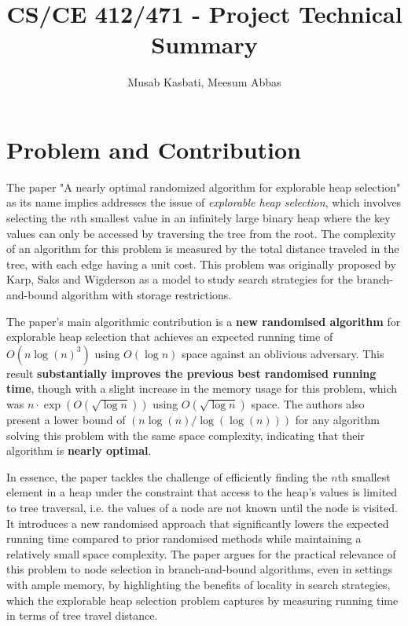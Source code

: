 \documentclass{article}
\title{CS/CE 412/471 - Project Technical Summary}
\author{Musab Kasbati, Meesum Abbas}
\date{}
\begin{document}
\maketitle

\section{Problem and Contribution}
The paper "A nearly optimal randomized algorithm for explorable heap
selection" \cite{Borst2025} as its name implies addresses the issue of \textit{explorable heap selection}, which involves selecting the $n$th smallest value in an infinitely large binary heap where the key values can only be accessed by traversing the tree from the root. The complexity of an algorithm for this problem is measured by the total distance traveled in the tree, with each edge having a unit cost. This problem was originally proposed by Karp, Saks and Wigderson as a model to study search strategies for the branch-and-bound algorithm with storage restrictions.

The paper's main algorithmic contribution is a \textbf{new randomised algorithm} for explorable heap selection that achieves an expected running time of $O(n \log(n)^3)$ using $O(\log n)$ space against an oblivious adversary. This result \textbf{substantially improves the previous best randomised running time}\cite{karp1986search}, though with a slight increase in the memory usage for this problem, which was $n \cdot \exp(O(\sqrt{\log n}))$ using $O(\sqrt{\log n})$ space. The authors also present a lower bound of $(n \log(n) / \log(\log(n)))$ for any algorithm solving this problem with the same space complexity, indicating that their algorithm is \textbf{nearly optimal}.

In essence, the paper tackles the challenge of efficiently finding the $n$th smallest element in a heap under the constraint that access to the heap's values is limited to tree traversal, i.e. the values of a node are not known until the node is visited. It introduces a new randomised approach that significantly lowers the expected running time compared to prior randomised methods while maintaining a relatively small space complexity. The paper argues for the practical relevance of this problem to node selection in branch-and-bound algorithms, even in settings with ample memory, by highlighting the benefits of locality in search strategies, which the explorable heap selection problem captures by measuring running time in terms of tree travel distance.
\end{document}
